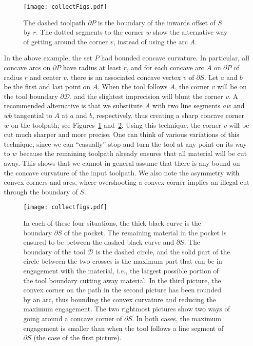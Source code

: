 \documentclass{article}
\newcommand{\PP}{P}
\newcommand{\cutdisk}{\mathcal D}
\newcommand{\arcA}{A}
\newcommand{\tool}{\cutdisk}
\begin{document}
\begin{figure}
\centering
\texttt{[image: collectFigs.pdf]}
\caption{
The dashed toolpath $\partial \PP$ is the boundary of the inwards offset of
$S$ by $r$. The dotted segments to the corner $w$
show the alternative way of getting around the corner $v$, instead of using the arc $A$.}
\label{heartExFig}
\end{figure}

\noindent
In the above example, the set $\PP$ had bounded concave curvature. In
particular, all concave arcs on $\partial\PP$ have radius at least $r$,
and for each concave arc $\arcA$ on $\partial \PP$ of radius
$r$ and center $v$, there is an associated concave vertex $v$ of
$\partial S$. Let $a$ and $b$ be the first and last point on
$\arcA$. When the tool follows $\arcA$, the corner $v$ will be on the
tool boundary $\partial\tool$, and the slightest imprecision will
blunt the corner $v$. A recommended alternative
\cite{park2003mitered} is that we substitute $\arcA$ with two line
segments $aw$ and $wb$ tangential to $\arcA$ at $a$ and $b$,
respectively, thus creating a sharp concave corner $w$ on the
toolpath; see Figures~\ref{heartExFig} and~\ref{cuttingCloseups}. Using this technique, the
corner $v$ will be cut much sharper and more precise. One can think of
various variations of this technique, since we can ``casually'' stop
and turn the tool at any point on its way to $w$ because the remaining
toolpath already ensures that all material will be cut away.  This
shows that we cannot in general assume that there is any bound on the
concave curvature of the input toolpath. We also note the asymmetry with
convex corners and arcs, where overshooting a convex corner implies an
illegal cut through the boundary of $S$.

\begin{figure}
\centering
\texttt{[image: collectfigs.pdf]}
\caption{In each of these four situations, the thick black curve is the boundary $\partial S$ of the pocket.
The remaining material in the pocket is ensured to be between the dashed black curve and $\partial S$.
The boundary of the tool $\tool$ is the dashed circle, and the solid part of the circle between the two crosses is the maximum part that can be in engagement with the material, i.e., the largest possible portion of the tool boundary cutting away material.
In the third picture, the convex corner on the path in the second picture has been rounded by an arc, thus bounding the convex curvature and reducing the maximum engagement.
The two rightmost pictures show two ways of going around a concave corner of $\partial S$.
In both cases, the maximum engagement is smaller than when the tool
follows a line segment of $\partial S$ (the case of the first picture).}
\label{cuttingCloseups}
\end{figure}
\end{document}
